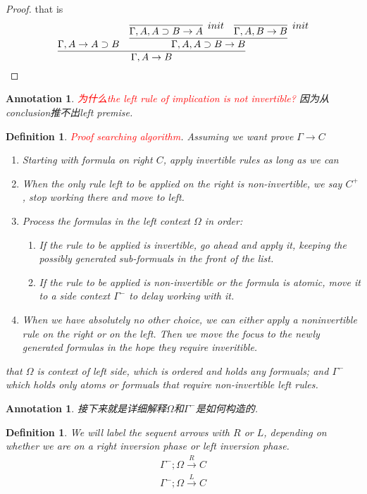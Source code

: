 \documentclass{article}
\theoremstyle{plain}
\newtheorem{definition}[theorem]{Definition}
\newtheorem{annotation}[theorem]{Annotation}
\theoremstyle{nonumberplain}
\newtheorem{proof}{Proof}
\newcommand{\redt}[1]{\textcolor{red}{#1}}
\begin{document}
\begin{proof}
\rm that is
$$
\infer[]{\Gamma, A \to B}{\Gamma, A \to A \supset B & \infer{\Gamma,A, A\supset B \to B}{\infer[init]{\Gamma, A, A \supset B \to A}{} & \infer[init]{\Gamma,A, B \to B}{}}}
$$
\end{proof}

\begin{annotation}
\rm \redt{为什么the left rule of implication is not invertible?} 因为从conclusion推不出left premise. 
\end{annotation}

\begin{definition}
\rm \redt{Proof searching algorithm}. Assuming we want prove $\Gamma \to C$
\begin{enumerate}
	\item Starting with formula on right $C$, apply invertible rules as long as we can
	\item When the only rule left to be applied on the right is non-invertible, we say $C^+$, stop working there and move to left.
	\item Process the formulas in the left context $\Omega$ in order:
	\begin{enumerate}
		\item If the rule to be applied is invertible, go ahead and apply it, keeping the possibly generated sub-formuals in the front of the list.
		\item If the rule to be applied is non-invertible or the formula is atomic, move it to a side context $\Gamma^-$ to delay working with it. 
	\end{enumerate}
	\item When we have absolutely no other choice, we can either apply a noninvertible rule on the right or on the left. Then we move the focus to the newly generated formulas in the hope they require inveritible.
\end{enumerate}
that $\Omega$ is context of left side, which is ordered and holds any formuals; and $\Gamma^-$ which holds only atoms or formuals that require non-invertible left rules.  
\end{definition}

\begin{annotation}
\rm 接下来就是详细解释$\Omega$和$\Gamma^-$是如何构造的.
\end{annotation}

\begin{definition}
\rm We will label the sequent arrows with $R$ or $L$, depending on whether we are on a right inversion phase or left inversion phase.
$$
\begin{gathered}
\Gamma^-;\Omega \xrightarrow{R} C \\
\Gamma^-;\Omega \xrightarrow{L} C \\
\end{gathered}
$$
\end{definition}
\end{document}

